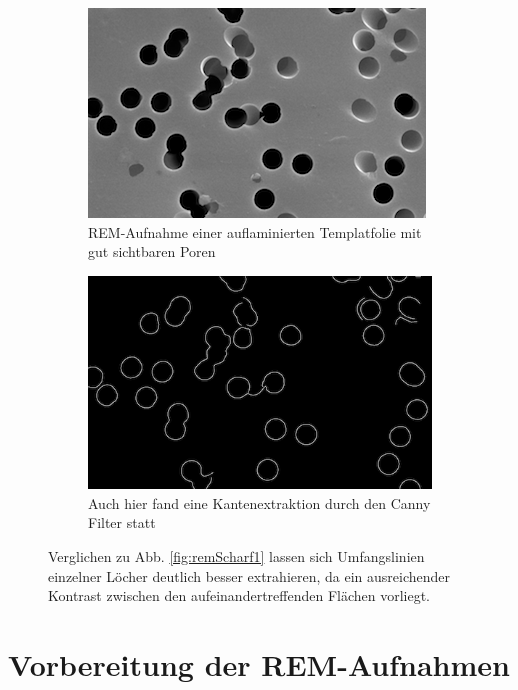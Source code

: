 \documentclass[accentcolor=tud1c, 11pt, toc=bib, toc=listof, captions=abovetable, parskip=half]{tudreport}
\begin{document}
\begin{figure}[h!]
    \centering
    \begin{subfigure}[b]{0.475\textwidth}
        \centering
        \includegraphics[scale=0.53]{Figures/remScharf2.png}
        \caption{REM-Aufnahme einer auflaminierten Templatfolie mit gut sichtbaren Poren}
        \label{fig:remScharf2}
    \end{subfigure}
    \hfill
    \begin{subfigure}[b]{0.475\textwidth}
        \centering
        \includegraphics[scale=0.38]{Figures/remScharf2Edge.png}
        \caption{Auch hier fand eine Kantenextraktion durch den Canny Filter statt}
        \label{fig:remScharf2Edge}
    \end{subfigure}
    \caption{Verglichen zu Abb. \ref{fig:remScharf1} lassen sich Umfangslinien einzelner Löcher deutlich besser extrahieren, da ein ausreichender Kontrast zwischen den aufeinandertreffenden Flächen vorliegt.}
\end{figure}
	
\chapter{Vorbereitung der REM-Aufnahmen}
\label{ch:preprocessing}
\end{document}
